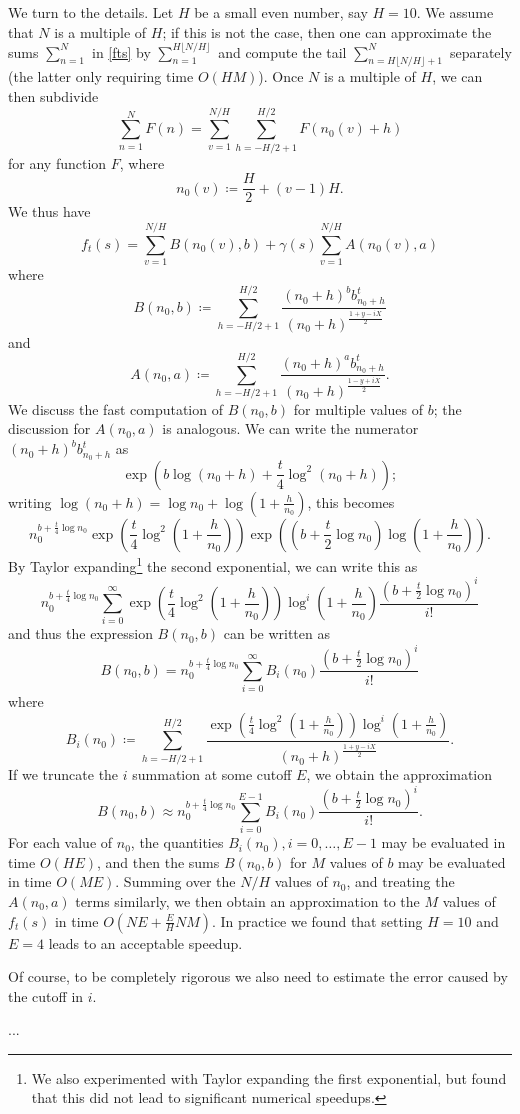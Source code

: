We turn to the details.  Let $H$ be a small even number, say $H=10$.  We assume that $N$ is a multiple of $H$; if this is not the case, then one can approximate the sums $\sum_{n=1}^N$ in \eqref{fts} by $\sum_{n=1}^{H \lfloor N/H \rfloor}$ and compute the tail $\sum_{n=H\lfloor N/H \rfloor+1}^N$ separately (the latter only requiring time $O(HM)$).  Once $N$ is a multiple of $H$, we can then subdivide
$$ \sum_{n=1}^N F(n) = \sum_{v=1}^{N/H} \sum_{h=-H/2+1}^{H/2} F(n_0(v) + h)$$
for any function $F$, where 
$$ n_0(v) \coloneqq \frac{H}{2} + (v-1) H.$$
We thus have
$$ f_t(s) = \sum_{v=1}^{N/H} B(n_0(v),b) + \gamma(s) \sum_{v=1}^{N/H} A(n_0(v),a)$$
where
$$ B(n_0,b) \coloneqq \sum_{h = -H/2+1}^{H/2} \frac{(n_0+h)^b b_{n_0+h}^t}{(n_0+h)^{\frac{1+y-iX}{2}}}$$
and
$$ A(n_0,a) \coloneqq \sum_{h = -H/2+1}^{H/2} \frac{(n_0+h)^a b_{n_0+h}^t}{(n_0+h)^{\frac{1-y+iX}{2}}}.$$
We discuss the fast computation of $B(n_0,b)$ for multiple values of $b$; the discussion for $A(n_0,a)$ is analogous.  We can write the numerator $(n_0+h)^b b_{n_0+h}^t$ as
$$ \exp( b \log(n_0+h) + \frac{t}{4} \log^2(n_0+h) );$$
writing $\log(n_0+h) = \log n_0 + \log(1+\frac{h}{n_0})$, this becomes
$$ n_0^{b + \frac{t}{4} \log n_0} \exp( \frac{t}{4} \log^2(1+\frac{h}{n_0}) ) \exp( (b + \frac{t}{2} \log n_0) \log(1+\frac{h}{n_0}) ).$$
By Taylor expanding\footnote{We also experimented with Taylor expanding the first exponential, but found that this did not lead to significant numerical speedups.} the second exponential, we can write this as
$$ n_0^{b + \frac{t}{4} \log n_0} \sum_{i=0}^\infty \exp( \frac{t}{4} \log^2(1+\frac{h}{n_0}) ) \log^i(1+\frac{h}{n_0}) \frac{(b+\frac{t}{2} \log n_0)^i}{i!}$$
and thus the expression $B(n_0,b)$ can be written as
$$ B(n_0,b) = n_0^{b + \frac{t}{4} \log n_0} \sum_{i=0}^\infty B_i(n_0) \frac{(b+\frac{t}{2} \log n_0)^i}{i!}$$
where
$$ B_i(n_0) \coloneqq \sum_{h = -H/2+1}^{H/2} \frac{\exp( \frac{t}{4} \log^2(1+\frac{h}{n_0}) ) \log^i(1+\frac{h}{n_0})}{(n_0+h)^{\frac{1+y-iX}{2}}}.$$
If we truncate the $i$ summation at some cutoff $E$, we obtain the approximation
$$ B(n_0,b) \approx n_0^{b + \frac{t}{4} \log n_0} \sum_{i=0}^{E-1} B_i(n_0) \frac{(b+\frac{t}{2} \log n_0)^i}{i!}.$$
For each value of $n_0$, the quantities $B_i(n_0), i=0,\dots,{E-1}$ may be evaluated in time $O(HE)$, and then the sums $B(n_0,b)$ for $M$ values of $b$ may be evaluated in time $O(ME)$.  Summing over the $N/H$ values of $n_0$, and treating the $A(n_0,a)$ terms similarly, we then obtain an approximation to the $M$ values of $f_t(s)$ in time $O( NE + \frac{E}{H} NM )$.  In practice we found that setting $H=10$ and $E=4$ leads to an acceptable speedup.

Of course, to be completely rigorous we also need to estimate the error caused by the cutoff in $i$.

...







